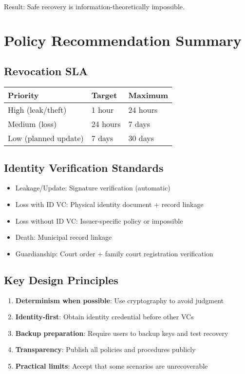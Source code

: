 Result: Safe recovery is information-theoretically impossible.

\section{Policy Recommendation Summary}

\subsection{Revocation SLA}

\begin{table}[h]
\centering
\begin{tabular}{|l|l|l|}
\hline
\textbf{Priority} & \textbf{Target} & \textbf{Maximum} \\
\hline
High (leak/theft) & 1 hour & 24 hours \\
Medium (loss) & 24 hours & 7 days \\
Low (planned update) & 7 days & 30 days \\
\hline
\end{tabular}
\end{table}

\subsection{Identity Verification Standards}

\begin{itemize}
  \item Leakage/Update: Signature verification (automatic)
  \item Loss with ID VC: Physical identity document + record linkage
  \item Loss without ID VC: Issuer-specific policy or impossible
  \item Death: Municipal record linkage
  \item Guardianship: Court order + family court registration verification
\end{itemize}

\subsection{Key Design Principles}

\begin{enumerate}
  \item \textbf{Determinism when possible}: Use cryptography to avoid judgment
  \item \textbf{Identity-first}: Obtain identity credential before other VCs
  \item \textbf{Backup preparation}: Require users to backup keys and test recovery
  \item \textbf{Transparency}: Publish all policies and procedures publicly
  \item \textbf{Practical limits}: Accept that some scenarios are unrecoverable
\end{enumerate}
